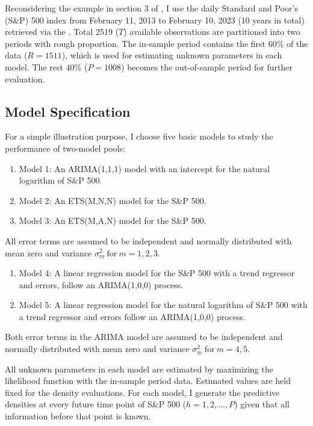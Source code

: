 \documentclass{monashthesis}
\begin{document}
Reconsidering the example in section 3 of \textcite{GA11}, I use the daily Standard and Poor's (S\&P) 500 index from February 11, 2013 to February 10, 2023 (10 years in total) retrieved via the \textcite{SP500}. Total 2519 (\(T\)) available observations are partitioned into two periods with rough proportion. The in-sample period contains the first 60\% of the data (\(R = 1511\)), which is used for estimating unknown parameters in each model. The rest 40\% (\(P = 1008\)) becomes the out-of-sample period for further evaluation.

\hypertarget{model-specification}{%
\subsection{Model Specification}\label{model-specification}}

For a simple illustration purpose, I choose five basic models to study the performance of two-model pools:

\begin{enumerate}
\def\labelenumi{\arabic{enumi}.}
\tightlist
\item
  Model 1: An ARIMA(1,1,1) model with an intercept for the natural logarithm of S\&P 500.
\item
  Model 2: An ETS(M,N,N) model for the S\&P 500.
\item
  Model 3: An ETS(M,A,N) model for the S\&P 500.
\end{enumerate}

All error terms are assumed to be independent and normally distributed with mean zero and variance \(\sigma_m^2 \ \text{for}\  m = 1,2,3\).

\begin{enumerate}
\def\labelenumi{\arabic{enumi}.}
\setcounter{enumi}{3}
\tightlist
\item
  Model 4: A linear regression model for the S\&P 500 with a trend regressor and errors, follow an ARIMA(1,0,0) process.
\item
  Model 5: A linear regression model for the natural logarithm of S\&P 500 with a trend regressor and errors follow an ARIMA(1,0,0) process.
\end{enumerate}

Both error terms in the ARIMA model are assumed to be independent and normally distributed with mean zero and variance \(\sigma_m^2 \ \text{for}\  m = 4,5\).

All unknown parameters in each model are estimated by maximizing the likelihood function with the in-sample period data. Estimated values are held fixed for the density evaluations. For each model, I generate the predictive densities at every future time point of S\&P 500 (\(h=1,2,...,P\)) given that all information before that point is known.
\end{document}
